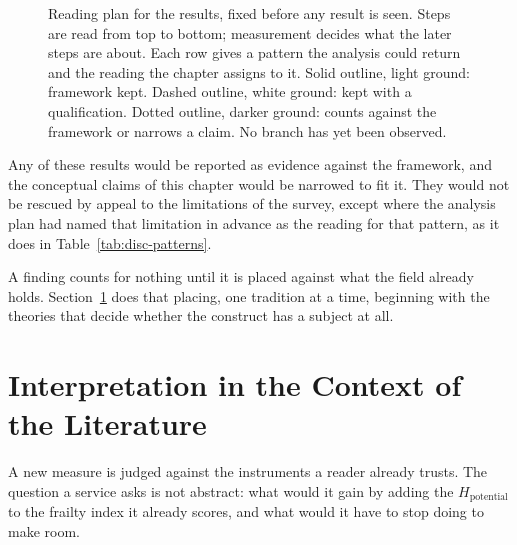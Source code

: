 \begin{figure}[htbp]
\centering

\captionsetup{justification=justified, width=\linewidth}
\caption{Reading plan for the results, fixed before any result is seen. Steps are
read from top to bottom; measurement decides what the later steps are about. Each
row gives a pattern the analysis could return and the reading the chapter assigns
to it. Solid outline, light ground: framework kept. Dashed outline, white ground:
kept with a qualification. Dotted outline, darker ground: counts against the
framework or narrows a claim. No branch has yet been observed.}
\label{fig:disc-decision}
\end{figure}

Any of these results would be reported as evidence against the framework, and the
conceptual claims of this chapter would be narrowed to fit it. They would not be
rescued by appeal to the limitations of the survey, except where the analysis plan
had named that limitation in advance as the reading for that pattern, as it does in
Table~\ref{tab:disc-patterns}.

A finding counts for nothing until it is placed against what the field already
holds. Section~\ref{sec:disc-literature} does that placing, one tradition at a
time, beginning with the theories that decide whether the construct has a subject
at all.

\section{Interpretation in the Context of the Literature}
\label{sec:disc-literature}

\noindent A new measure is judged against the instruments a reader already
trusts. The question a service asks is not abstract: what would it gain by adding
the $H_{\text{potential}}$ to the frailty index it already scores, and what would
it have to stop doing to make room.

